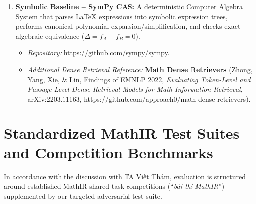 ﻿\documentclass[11pt,a4paper]{article}
\begin{document}
\begin{enumerate}
\begin{itemize}
		\end{itemize}
		\item \textbf{Symbolic Baseline -- SymPy CAS:} A deterministic Computer Algebra System that parses \LaTeX{} expressions into symbolic expression trees, performs canonical polynomial expansion/simplification, and checks exact algebraic equivalence ($\Delta = f_A - f_B = 0$).
		\begin{itemize}
			\item \textit{Repository:} \url{https://github.com/sympy/sympy}.
			\item \textit{Additional Dense Retrieval Reference:} \textbf{Math Dense Retrievers} (Zhong, Yang, Xie, \& Lin, Findings of EMNLP 2022, \textit{Evaluating Token-Level and Passage-Level Dense Retrieval Models for Math Information Retrieval}, arXiv:2203.11163, \url{https://github.com/approach0/math-dense-retrievers}).
		\end{itemize}
	\end{enumerate}

	\section{Standardized MathIR Test Suites and Competition Benchmarks}
	In accordance with the discussion with TA \foreignlanguage{vietnamese}{Viết Thám}, evaluation is structured around established MathIR shared-task competitions (``\textit{bài thi MathIR}'') supplemented by our targeted adversarial test suite.
\end{document}

